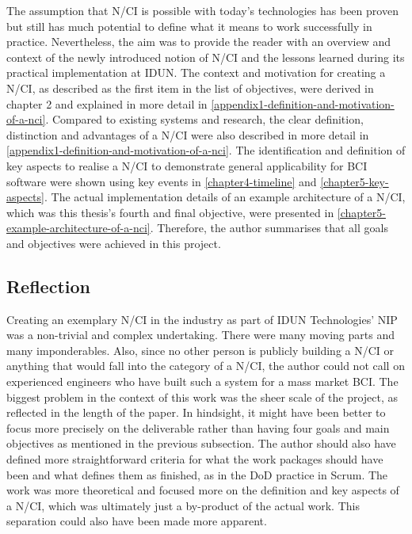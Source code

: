 The assumption that N/CI is possible with today's technologies has been proven but still has much potential to define what it means to work successfully in practice. Nevertheless, the aim was to provide the reader with an overview and context of the newly introduced notion of N/CI and the lessons learned during its practical implementation at IDUN. The context and motivation for creating a N/CI, as described as the first item in the list of objectives, were derived in chapter 2 and explained in more detail in \autoref{appendix1-definition-and-motivation-of-a-nci}. Compared to existing systems and research, the clear definition, distinction and advantages of a N/CI were also described in more detail in \autoref{appendix1-definition-and-motivation-of-a-nci}. The identification and definition of key aspects to realise a N/CI to demonstrate general applicability for BCI software were shown using key events in \autoref{chapter4-timeline} and \autoref{chapter5-key-aspects}. The actual implementation details of an example architecture of a N/CI, which was this thesis's fourth and final objective, were presented in \autoref{chapter5-example-architecture-of-a-nci}. Therefore, the author summarises that all goals and objectives were achieved in this project.

\subsection{Reflection}
\label{chapter5-reflection}

Creating an exemplary N/CI in the industry as part of IDUN Technologies' NIP was a non-trivial and complex undertaking. There were many moving parts and many imponderables. Also, since no other person is publicly building a N/CI or anything that would fall into the category of a N/CI, the author could not call on experienced engineers who have built such a system for a mass market BCI. The biggest problem in the context of this work was the sheer scale of the project, as reflected in the length of the paper. In hindsight, it might have been better to focus more precisely on the deliverable rather than having four goals and main objectives as mentioned in the previous subsection. The author should also have defined more straightforward criteria for what the work packages should have been and what defines them as finished, as in the DoD practice in Scrum. The work was more theoretical and focused more on the definition and key aspects of a N/CI, which was ultimately just a by-product of the actual work. This separation could also have been made more apparent.

